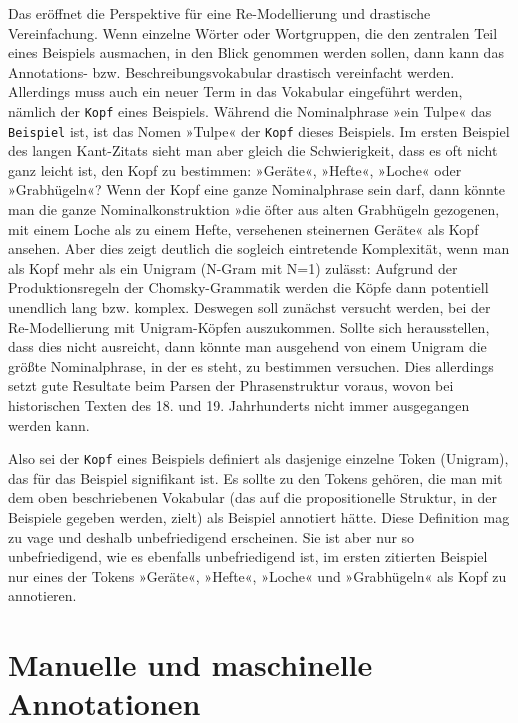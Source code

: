 \documentclass{article}
\newcommand*{\vokabular}{\texttt}%
\begin{document}
Das eröffnet die Perspektive für eine Re-Modellierung und drastische
Vereinfachung. Wenn einzelne Wörter oder Wortgruppen, die den
zentralen Teil eines Beispiels ausmachen, in den Blick genommen werden
sollen, dann kann das Annotations- bzw. Beschreibungsvokabular
drastisch vereinfacht werden. Allerdings muss auch ein neuer Term in
das Vokabular eingeführt werden, nämlich der \vokabular{Kopf} eines
Beispiels. Während die Nominalphrase »ein Tulpe« das
\vokabular{Beispiel} ist, ist das Nomen »Tulpe« der \vokabular{Kopf}
dieses Beispiels. Im ersten Beispiel des langen Kant-Zitats sieht man
aber gleich die Schwierigkeit, dass es oft nicht ganz leicht ist, den
Kopf zu bestimmen: »Geräte«, »Hefte«, »Loche« oder »Grabhügeln«? Wenn
der Kopf eine ganze Nominalphrase sein darf, dann könnte man die ganze
Nominalkonstruktion »die öfter aus alten Grabhügeln gezogenen, mit
einem Loche als zu einem Hefte, versehenen steinernen Geräte« als Kopf
ansehen. Aber dies zeigt deutlich die sogleich eintretende
Komplexität, wenn man als Kopf mehr als ein Unigram (N-Gram mit N=1)
zulässt: Aufgrund der Produktionsregeln der Chomsky-Grammatik werden
die Köpfe dann potentiell unendlich lang bzw. komplex. Deswegen soll
zunächst versucht werden, bei der Re-Modellierung mit Unigram-Köpfen
auszukommen. Sollte sich herausstellen, dass dies nicht ausreicht,
dann könnte man ausgehend von einem Unigram die größte Nominalphrase,
in der es steht, zu bestimmen versuchen. Dies allerdings setzt gute
Resultate beim Parsen der Phrasenstruktur voraus, wovon bei
historischen Texten des 18. und 19. Jahrhunderts nicht immer
ausgegangen werden kann.

Also sei der \vokabular{Kopf} eines Beispiels definiert als dasjenige
einzelne Token (Unigram), das für das Beispiel signifikant ist. Es
sollte zu den Tokens gehören, die man mit dem oben beschriebenen
Vokabular (das auf die propositionelle Struktur, in der Beispiele
gegeben werden, zielt) als Beispiel annotiert hätte. Diese Definition
mag zu vage und deshalb unbefriedigend erscheinen. Sie ist aber nur so
unbefriedigend, wie es ebenfalls unbefriedigend ist, im ersten
zitierten Beispiel nur eines der Tokens »Geräte«, »Hefte«, »Loche« und
»Grabhügeln« als Kopf zu annotieren.


\section{Manuelle und maschinelle Annotationen}
\end{document}

